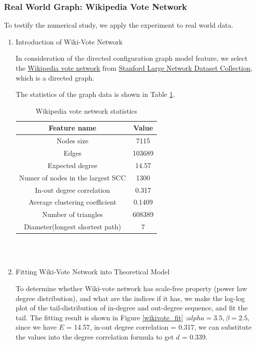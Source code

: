 \documentclass{article}
\begin{document}
\newpage

\subsubsection{Real World Graph: Wikipedia Vote Network}
\par To testify the numerical study, we apply the experiment to real world data. 

\begin{enumerate}
\item Introduction of Wiki-Vote Network\\

\par In consideration of the directed configuration graph model feature, we select the \hyperlink{wikivote_intro}{Wikipedia vote network} from \href{https://snap.stanford.edu/data/}{Stanford Large Network Dataset Collection}, which is a directed graph. 
\par The statistics of the graph data is shown in Table \ref{wikivote_stats}.
\quad\\
\begin{table}[!hbp]
\centering
\caption{Wikipedia vote network statistics}\label{wikivote_stats}
\begin{tabular}{cc}

\toprule
Feature name & Value\\
\midrule
Nodes size & 7115\\
Edges & 103689\\
Expected degree & 14.57\\
Numer of nodes in the largest SCC & 1300\\
In-out degree correlation & 0.317\\
Average clustering coefficient & 0.1409\\
Number of triangles & 608389\\
Diameter(longest shortest path) & 7\\

\bottomrule

\cline{1-2}
\hline
\end{tabular}
\end{table}
\\
\quad\\

\item Fitting Wiki-Vote Network into Theoretical Model\\

\par To determine whether Wiki-vote network has scale-free property (power law degree distribution), and what are the indices if it has, we make the log-log plot of the tail-distribution of in-degree and out-degree sequence, and fit the tail. \hypertarget{powerlaw_fit}{The fitting result} is shown in Figure \ref{wikivote_fit} :$alpha =3.5, \beta = 2.5$,  since we have $E$ = 14.57, in-out degree correlation = 0.317, we can substitute the values into the degree correlation formula to get $d$ = 0.339. 



\end{enumerate}
\end{document}
